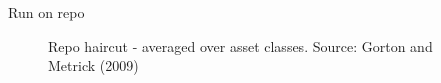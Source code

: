 \begin{frame}{Run on repo}

\begin{figure}
\begin{center}


\caption{\label{fig:L4_gorton_metrick_repo_haircut} Repo haircut - averaged over asset classes. Source: Gorton and Metrick (2009)}

\end{center}
\end{figure}

\end{frame}




